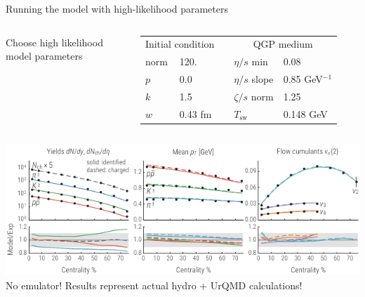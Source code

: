 \documentclass[xcolor=dvipsnames]{beamer}
\begin{document}
\begin{frame}{Running the model with high-likelihood parameters}
    \vfill
    \centering
    \begin{columns}
        \begin{column}{0.4\textwidth}
            Choose high likelihood \\model parameters
        \end{column}
        \begin{column}{0.6\textwidth}
            \begin{tabular}{lllll}
                \multicolumn{2}{c}{Initial condition} & & \multicolumn{2}{c}{QGP medium} \\
                \noalign{\smallskip}\hline\noalign{\smallskip}
                norm & 120.          &&  $\eta/s$ min   & 0.08       \\
                $p$  & 0.0           &&  $\eta/s$ slope & 0.85 GeV$^{-1}$   \\
                $k$  & 1.5           &&  $\zeta/s$ norm & 1.25       \\
                $w$  & 0.43 fm       &&  $T_\text{sw}$  & 0.148 GeV  \\
            \end{tabular}
        \end{column}
    \end{columns}
    \vspace{0.5 cm}
    \includegraphics{mode_observables} \\
    \vspace{0.2 cm}
    No emulator! Results represent actual hydro + UrQMD calculations!
\end{frame}
\end{document}
